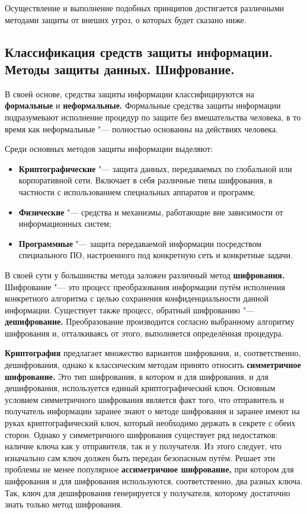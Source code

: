 Осуществление и выполнение подобных принципов достигается различными методами защиты от внеших угроз, о которых будет сказано ниже.


\newpage
\subsection{Классификация средств защиты информации. Методы защиты данных. Шифрование.}
В своей основе, средства защиты информации классифицируются на \textbf{формальные} и \textbf{неформальные.} Формальные средства защиты информации подразумевают исполнение процедур по защите 
без вмешательства человека, в то время как неформальные "--- полностью основанны на действиях человека.

Среди основных методов защиты информации выделяют:
\begin{itemize}
    \item \textbf{Криптографические} "--- защита данных, передаваемых по глобальной или корпоративной сети. Включает в себя различные типы шифрования, в частности с использованием специальных аппаратов
    и программ;
    \item \textbf{Физические} "--- средства и механизмы, работающие вне зависимости от информационных систем;
    \item \textbf{Программные} "--- защита передаваемой информации посредством специального ПО, настроенного под конкретную сеть и конкретные задачи.
\end{itemize}

В своей сути у большинства метода заложен различный метод \textbf{шифрования.} Шифрование "--- это процесс преобразования информации путём исполнения конкретного алгоритма с целью сохранения конфиденциальности
данной информации. Существует также процесс, обратный шифрованию "--- \textbf{дешифрование.} Преобразование производится согласно выбранному алгоритму шифрования 
и, отталкиваясь от этого, выполняется определённая процедура.

\textbf{Криптография} предлагает множество вариантов шифрования, и, соответственно, дешифрования, однако к классическим методам принято относить \textbf{симметричное шифрование.} Это тип шифрования, в котором и для шифрования, и для дешифрования,
используется единый криптографический ключ. Основным условием симметричного шифрования является факт того, что отправитель и получатель информации заранее знают о 
методе шифрования и заранее имеют на руках криптографический ключ, который необходимо держать в секрете с обеих сторон. Однако у симметричного шифрования существует ряд недостатков: наличие ключа как у отправителя, так и у получателя.
Из этого следует, что изначально сам ключ должен быть передан безопасным путём. Решает эти проблемы не менее популярное \textbf{ассиметричное шифрование,} при котором для шифрования и для шифрования используются, соответственно, два разных ключа.
Так, ключ для дешифрования генерируется у получателя, которому достаточно знать только метод шифрования.\cite{shifr}





